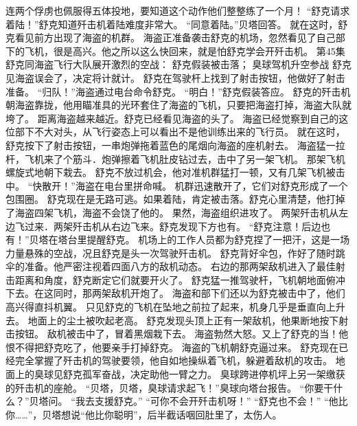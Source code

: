 \documentclass[a4paper,12pt,UTF8,twoside]{ctexbook}
\begin{document}
        连两个俘虏也佩服得五体投地，要知道这个动作他们整整练了一个月！ 
        “舒克请求着陆！”舒克知道歼击机着陆难度非常大。 
        “同意着陆。”贝塔回答。 
        就在这时，舒克看见前方出现了海盗的机群。 
        海盗正准备袭击舒克的机场，忽然看见了自己部下的飞机，很是高兴。他之所以这么快回来，就是怕舒克学会开歼击机。   第45集 
        舒克同海盗飞行大队展开激烈的空战： 
        舒克假装被击落； 
        臭球驾机升空参战   
        舒克见海盗误会了，决定将计就计。 
        舒克在驾驶杆上找到了射击按钮，他做好了射击准备。 
        “归队！”海盗通过电台命令舒克。 
        “明白！”舒克假装答应。 
        舒克的歼击机朝海盗靠拢，他用瞄准具的光环套住了海盗的飞机，只要把海盗打掉，海盗大队就 垮了。 
        距离海盗越来越近。舒克已经看见海盗的头了。 
        海盗已经觉察到自己的这位部下不大对头，从飞行姿态上可以看出不是他训练出来的飞行员。 
        就在这时，舒克按下了射击按钮，一串炮弹拖着蓝色的尾烟向海盗的座机射去。 
        海盗猛一拉杆，飞机来了个筋斗．炮弹擦着飞机肚皮钻过去，击中了另一架飞机。 
        那架飞机螺旋式地朝下栽去。 
        舒克不放过机会，他对准机群猛打一顿，又有几架飞机被击中。 
        “快散开！”海盗在电台里拼命喊。 
        机群迅速散开了，它们对舒克形成了一个包围圈。 
        舒克现在是无路可逃。如果着陆，肯定被击落。舒克心里清楚，他打掉了海盗四架飞机，海盗不会饶了他的。 
        果然，海盗组织进攻了。 
        两架歼击机从左边飞过来．两架歼击机从右边飞来。舒克发现下方也有。 
        “舒克注意！后边也有！”贝塔在塔台里提醒舒克。 
        机场上的工作人员都为舒克捏了一把汗，这是一场力量悬殊的空战，况且舒克是头一次驾驶歼击机。 
        舒克背好伞包，作好了随时跳伞的准备。他严密注视着四面八方的敌机动态。 
        右边的那两架敌机进入了最佳射击距离和角度，舒克断定它们就要开火了。 
        舒克猛一推驾驶杆，飞机朝地面俯冲下去。在这同时，那两架敌机开炮了。 
        海盗和部下们还以为舒克被击中了，他们高兴得直抖机翼。 
        只见舒克的飞机在坠地之前拉了起来，机身几乎是垂直向上升去。 
        地面上的尘土被吹起老高。 
        舒克发现头顶上正有一架敌机，他果断地按下射击按钮。 
        敌机被击中了，冒着黑烟栽下去。 
        海盗勃然大怒。又上了舒克的当！他恨不得把舒克吃了，他要亲手打掉舒克。 
        海盗的飞机朝舒克逼过来。 
        舒克现在已经完全掌握了歼击机的驾驶要领，他自如地操纵着飞机，躲避着敌机的攻击。 
        地面上的臭球见舒克孤军奋战，决定助他一臂之力。 
        臭球跨进停机坪上另一架缴获的歼击机的座舱。 
        “贝塔，贝塔，臭球请求起飞！”臭球向塔台报告。 
        “你要干什么？”贝塔问。 
        “我去支援舒克。” 
        “可你不会开歼击机呀！” 
        “舒克也不会！” 
        “他比你……”，贝塔想说“他比你聪明”，后半截话咽回肚里了，太伤人。 
\end{document}
